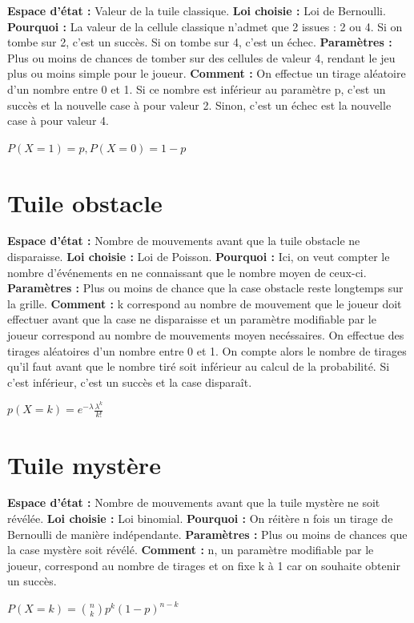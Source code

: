\documentclass[a4paper, 12pt]{report}
\begin{document}
\begin{flushleft}
\textbf{Espace d'état :} Valeur de la tuile classique.\break
\textbf{Loi choisie :} Loi de Bernoulli.\break
\textbf{Pourquoi :} La valeur de la cellule classique n’admet que 2 issues : 2 ou 4. Si on tombe sur 2, c’est un succès. Si on tombe sur 4, c’est un échec.\break
\textbf{Paramètres :} Plus ou moins de chances de tomber sur des cellules de valeur 4, rendant le jeu plus ou moins simple pour le joueur.\break
\textbf{Comment :} On effectue un tirage aléatoire d’un nombre entre 0 et 1.  Si ce nombre est inférieur au paramètre p, c’est un succès et la nouvelle case à pour valeur 2. 
Sinon, c’est un échec est la nouvelle case à pour valeur 4.\break

\begin{center}
${P(X = 1) = p, P(X = 0) = 1-p}$
\end{center}


\section{Tuile obstacle}

\textbf{Espace d'état :} Nombre de mouvements avant que la tuile obstacle ne disparaisse.\break
\textbf{Loi choisie :} Loi de Poisson.\break
\textbf{Pourquoi :} Ici, on veut compter le nombre d'événements en ne connaissant que le nombre moyen de ceux-ci.\break
\textbf{Paramètres :} Plus ou moins de chance que la case obstacle reste longtemps sur la grille.\break
\textbf{Comment :} k correspond au nombre de mouvement que le joueur doit effectuer avant que la case ne disparaisse et un paramètre modifiable par le joueur correspond au nombre de mouvements moyen necéssaires. 
On effectue des tirages aléatoires d’un nombre entre 0 et 1.  On compte alors le nombre de tirages qu’il faut avant que le nombre tiré soit inférieur au calcul de la probabilité. Si c’est inférieur, c’est un succès et la case disparaît.\break

\begin{center}
${p(X=k)=e^{-\lambda}\frac{\lambda^k}{k!}}$
\end{center}

\section{Tuile mystère}

\textbf{Espace d'état :} Nombre de mouvements avant que la tuile mystère ne soit révélée.\break
\textbf{Loi choisie :} Loi binomial.\break
\textbf{Pourquoi :} On réitère n fois un tirage de Bernoulli de manière indépendante.\break
\textbf{Paramètres :} Plus ou moins de chances que la case mystère soit révélé.\break
\textbf{Comment :} n, un paramètre modifiable par le joueur,  correspond au nombre de tirages et on fixe k à 1 car on souhaite obtenir un succès.\break

\begin{center}
${P(X=k)={n \choose k} p^k(1-p)^{n-k}}$
\end{center}

\end{flushleft}
\end{document}
